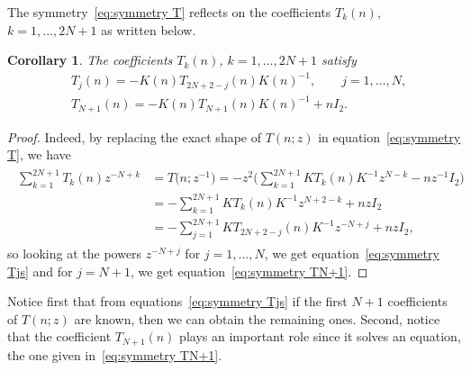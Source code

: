 \documentclass[pdftex]{sigma}%
\numberwithin{equation}{section}
\newtheorem{Corollary}[Theorem]{Corollary}
\begin{document}
The symmetry~\eqref{eq:symmetry T} reflects on the coefficients $T_k(n)$, $k=1,\dots,2N+1$ as written below.
	\begin{Corollary} The coefficients $T_k(n)$, $k=1,\dots,2N+1$ satisfy
	\begin{align}
		&\label{eq:symmetry Tjs}
		T_j(n)=-K(n)T_{2N+2-j}(n)K(n)^{-1}, \qquad j=1,\dots, N, \\
		&\label{eq:symmetry TN+1}T_{N+1}(n) =-K(n)T_{N+1}(n)K(n)^{-1}+nI_2.
	\end{align}
\end{Corollary}
\begin{proof}
	Indeed, by replacing the exact shape of $T(n;z) $ in equation~\eqref{eq:symmetry T}, we have
	\begin{align*}
\begin{split}
		\sum_{k=1}^{2N+1}T_k(n)z^{-N+k}&=T\big(n;z^{-1}\big)
=-z^2\Bigg(\sum_{k=1}^{2N+1}KT_k(n)K^{-1}z^{N-k}-nz^{-1}I_2\Bigg)\\
		&=-\sum_{k=1}^{2N+1}KT_k(n)K^{-1}z^{N+2-k}+nzI_2\\
		&=-\sum_{j=1}^{2N+1}KT_{2N+2-j}(n)K^{-1}z^{-N+j}+nzI_2,
\end{split}
	\end{align*}
	so looking at the powers $z^{-N+j}$ for $j=1,\dots, N$, we get equation~\eqref{eq:symmetry Tjs} and for $j=N+1$, we get equation~\eqref{eq:symmetry TN+1}.
\end{proof}

Notice first that from equations~\eqref{eq:symmetry Tjs} if the first $N+1$ coefficients of $T(n;z)$ are known, then we can obtain the remaining ones. Second, notice that the coefficient $T_{N+1}(n)$ plays an important role since it solves an equation, the one given in~\eqref{eq:symmetry TN+1}.
\end{document}

